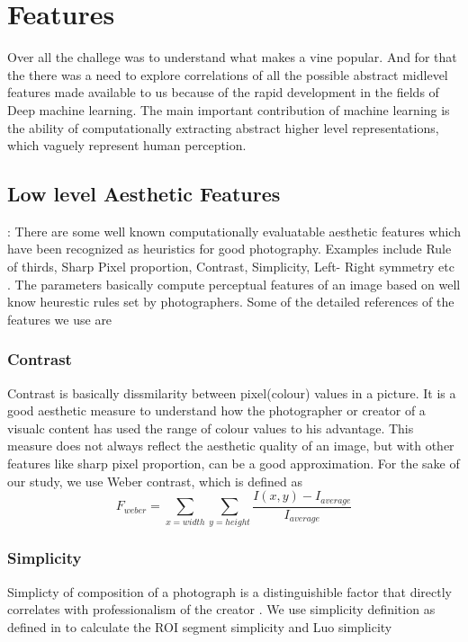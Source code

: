 \section{Features}

Over all the challege was to understand what makes a vine popular. And for that the there was a need to explore correlations of all the possible abstract midlevel features made available to us because of the rapid development in the fields of Deep machine learning. The main important contribution of machine learning is the ability of computationally extracting abstract higher level representations, which vaguely represent human perception. 

\subsection{Low level Aesthetic Features}:
There are some well known computationally evaluatable aesthetic features which have been recognized as heuristics for good photography. Examples include Rule of thirds, Sharp Pixel proportion, Contrast, Simplicity, Left- Right symmetry etc \cite{yeh2010personalized}. The parameters basically compute perceptual features of an image based on well know heurestic rules set by photographers. Some of the detailed references of the features we use are 

\subsubsection{Contrast}
Contrast is basically dissmilarity between pixel(colour) values in a picture. It is a good aesthetic measure to understand how the photographer or creator of a visualc content has used the range of colour values to his advantage. This measure does not always reflect the aesthetic  quality of an image, but with other features like sharp pixel proportion, can be a good approximation. For the sake of our study, we use Weber contrast, which is defined as 
\begin{equation}
F_\textit{weber} = \sum_{x = width}\sum_{y = height} \frac{I(x,y) - I_\textit{average}}{I_\textit{average}} 
\end{equation}


\subsubsection{Simplicity}
Simplicty of composition of a photograph is a distinguishible factor that directly correlates with professionalism of the creator \cite{ke2006design}. We use simplicity definition as defined in \cite{yeh2010personalized} to calculate the ROI segment simplicity and Luo simplicity \cite{luo2008photo}

